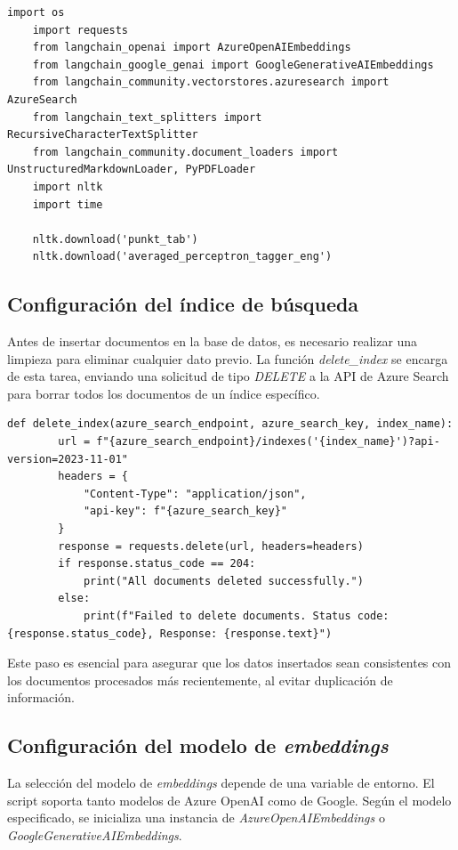 \begin{lstlisting}[label=cod:update-db-1,caption=Importación de bibliotecas y configuración inicial.]
	import os
	import requests
	from langchain_openai import AzureOpenAIEmbeddings
	from langchain_google_genai import GoogleGenerativeAIEmbeddings
	from langchain_community.vectorstores.azuresearch import AzureSearch
	from langchain_text_splitters import RecursiveCharacterTextSplitter
	from langchain_community.document_loaders import UnstructuredMarkdownLoader, PyPDFLoader
	import nltk
	import time

	nltk.download('punkt_tab')
	nltk.download('averaged_perceptron_tagger_eng')
\end{lstlisting}

\subsection{Configuración del índice de búsqueda}

Antes de insertar documentos en la base de datos, es necesario realizar una limpieza para eliminar cualquier dato previo. La función 
\textit{delete\_index} se encarga de esta tarea, enviando una solicitud de tipo \textit{DELETE} a la API de Azure Search para borrar todos 
los documentos de un índice específico.

\begin{lstlisting}[label=cod:update-db-2,caption=Configuración del índice de búsqueda.]
	def delete_index(azure_search_endpoint, azure_search_key, index_name):
		url = f"{azure_search_endpoint}/indexes('{index_name}')?api-version=2023-11-01"
		headers = {
			"Content-Type": "application/json",
			"api-key": f"{azure_search_key}"
		}
		response = requests.delete(url, headers=headers)
		if response.status_code == 204:
			print("All documents deleted successfully.")
		else:
			print(f"Failed to delete documents. Status code: {response.status_code}, Response: {response.text}")
\end{lstlisting}

Este paso es esencial para asegurar que los datos insertados sean consistentes con los documentos procesados más recientemente, al evitar 
duplicación de información.

\subsection{Configuración del modelo de \textit{embeddings}}

La selección del modelo de \textit{embeddings} depende de una variable de entorno. El script soporta tanto modelos de Azure OpenAI como de Google. 
Según el modelo especificado, se inicializa una instancia de \textit{AzureOpenAIEmbeddings} o \textit{GoogleGenerativeAIEmbeddings}.

